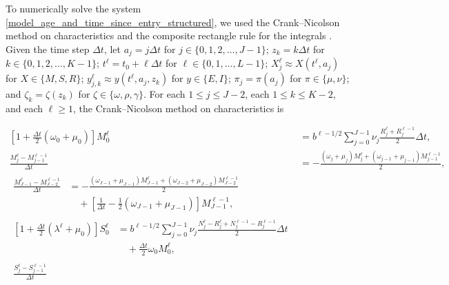 \documentclass{jpmarticle}
\let\subequationsorig\subequations%
\let\endsubequationsorig\endsubequations%
\renewenvironment{subequations}{
  \subequationsorig
  \renewcommand{\theequation}{\theparentequation.\arabic{equation}}
}{
  \endsubequationsorig
}
\begin{document}
To numerically solve the system
\eqref{model_age_and_time_since_entry_structured}, we used the
Crank--Nicolson method on characteristics and the composite rectangle
rule for the integrals \autocite{milner_1992}.  Given the time step
$\Delta t$, let $a_j = j \Delta t$ for
$j \in \{0, 1, 2, \ldots, J - 1\}$;
$z_k = k \Delta t$
for $k \in \{0, 1, 2, \ldots, K - 1\}$;
$t^{\ell} = t_0 + \ell \Delta t$ for
$\ell \in \{0, 1, \ldots, L - 1\}$;
$X_j^{\ell} \approx X(t^{\ell}, a_j)$
for $X \in \{M, S, R\}$;
$y_{j, k}^{\ell} \approx y(t^{\ell}, a_j, z_k)$
for $y \in \{E, I\}$;
$\pi_j = \pi(a_j)$ for $\pi \in \{\mu, \nu\}$; and
$\zeta_k = \zeta(z_k)$ for $\zeta \in \{\omega, \rho, \gamma\}$.
For each $1 \leq j \leq J - 2$, each $1 \leq k \leq K - 2$, and each
$\ell \geq 1$, the Crank--Nicolson method on characteristics is
\begin{subequations}
  \label{numerics_age_and_time_since_entry_structured}
  \begin{align}
    \left[1 + \frac{\Delta t}{2} (\omega_0 + \mu_0)\right] M_0^{\ell}
    &= b^{\ell - 1 / 2}
    \sum_{j = 0}^{J - 1} \nu_j \frac{R_j^{\ell} + R_j^{\ell - 1}}{2}
    \Delta t,
    \\
    \frac{M_j^{\ell} - M_{j - 1}^{\ell - 1}}{\Delta t}
    &=
    - \frac{(\omega_j + \mu_j) M_j^{\ell}
      + (\omega_{j - 1} + \mu_{j - 1}) M_{j - 1}^{\ell - 1}}
    {2},
    \\
    \begin{split}
      \frac{M_{J - 1}^{\ell} - M_{J - 2}^{\ell - 1}}{\Delta t}
      &=
      - \frac{(\omega_{J - 1} + \mu_{J - 1}) M_{J - 1}^{\ell}
        + (\omega_{J - 2} + \mu_{J - 2}) M_{J - 2}^{\ell - 1}}
      {2}
      \\ & \quad {}
      +  \left[\frac{1}{\Delta t}
        - \frac{1}{2} (\omega_{J - 1} + \mu_{J - 1})\right]
      M_{J - 1}^{\ell - 1},
    \end{split}
    \\
    \begin{split}
      \left[1 + \frac{\Delta t}{2} (\lambda^{\ell} + \mu_0)\right] S_0^{\ell}
      &=
      b^{\ell - 1 / 2}
      \sum_{j = 0}^{J - 1} \nu_j
      \frac{N_j^{\ell} - R_j^{\ell} + N_j^{\ell - 1} - R_j^{\ell - 1}}
      {2}
      \Delta t
      \\ & \quad {}
      + \frac{\Delta t}{2} \omega_0 M_0^{\ell},
    \end{split}
    \\
    \begin{split}
      \frac{S_j^{\ell} - S_{j - 1}^{\ell - 1}}{\Delta t}

\end{split}
\end{align}
\end{subequations}
\end{document}
